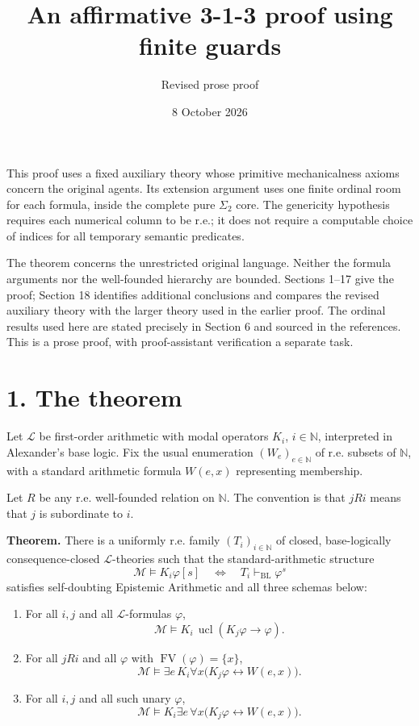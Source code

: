\documentclass[
  11pt,
  letterpaper,
]{article}
\title{An affirmative 3-1-3 proof using finite guards}
\subtitle{Revised prose proof}
\author{}
\date{8 October 2026}
\begin{document}
\maketitle

This proof uses a fixed auxiliary theory whose primitive mechanicalness
axioms concern the original agents. Its extension argument uses one
finite ordinal room for each formula, inside the complete pure
\(\Sigma_2\) core. The genericity hypothesis requires each numerical
column to be r.e.; it does not require a computable choice of indices
for all temporary semantic predicates.

The theorem concerns the unrestricted original language. Neither the
formula arguments nor the well-founded hierarchy are bounded. Sections
1--17 give the proof; Section 18 identifies additional conclusions and
compares the revised auxiliary theory with the larger theory used in the
earlier proof. The ordinal results used here are stated precisely in
Section 6 and sourced in the references. This is a prose proof, with
proof-assistant verification a separate task.

\section{1. The theorem}\label{the-theorem}

Let \(\mathcal L\) be first-order arithmetic with modal operators
\(K_i\), \(i\in\mathbb N\), interpreted in Alexander's base logic. Fix
the usual enumeration \((W_e)_{e\in\mathbb N}\) of r.e. subsets of
\(\mathbb N\), with a standard arithmetic formula \(W(e,x)\)
representing membership.

Let \(R\) be any r.e. well-founded relation on \(\mathbb N\). The
convention is that \(jRi\) means that \(j\) is subordinate to \(i\).

\textbf{Theorem.} There is a uniformly r.e. family
\((T_i)_{i\in\mathbb N}\) of closed, base-logically consequence-closed
\(\mathcal L\)-theories such that the standard-arithmetic structure \[
\mathcal M\models K_i\varphi[s]
\quad\Longleftrightarrow\quad
T_i\vdash_{\mathrm{BL}}\varphi^s
\tag{T}
\] satisfies self-doubting Epistemic Arithmetic and all three schemas
below:

\begin{enumerate}
\def\labelenumi{\arabic{enumi}.}
\item
  For all \(i,j\) and all \(\mathcal L\)-formulas \(\varphi\), \[
  \mathcal M\models
  K_i\,\operatorname{ucl}(K_j\varphi\to\varphi).
  \tag{Truth}
  \]
\item
  For all \(jRi\) and all \(\varphi\) with
  \(\operatorname{FV}(\varphi)=\{x\}\), \[
  \mathcal M\models
  \exists e\,K_i\forall x
     \bigl(K_j\varphi\leftrightarrow W(e,x)\bigr).
  \tag{Code}
  \]
\item
  For all \(i,j\) and all such unary \(\varphi\), \[
  \mathcal M\models
  K_i\exists e\,\forall x
     \bigl(K_j\varphi\leftrightarrow W(e,x)\bigr).
  \tag{Mechanical}
  \]
\end{enumerate}
\end{document}
